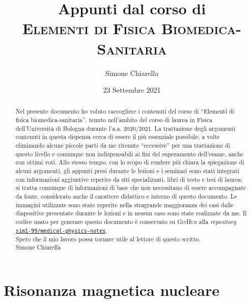 \documentclass{report}
\title{Appunti dal corso di\\\vspace{10 pt} \textsc{\huge Elementi di Fisica Biomedica-Sanitaria}}
\author{Simone Chiarella}
\date{23 Settembre 2021}
\newcommand{\virgolette}[1]{``#1''}
\numberwithin{equation}{section}
\numberwithin{figure}{section}
\begin{document}
\maketitle
\shipout\hbox{}

\begin{abstract}
\large{Nel presente documento ho voluto raccogliere i contenuti del corso di \virgolette{Elementi di fisica biomedica-sanitaria}, tenuto nell'ambito del corso di laurea in Fisica dell'Università di Bologna durante l'a.a. 2020/2021. La trattazione degli argomenti contenuti in questa dispensa cerca di essere il più essenziale possibile, a volte eliminando alcune piccole parti da me ritenute \virgolette{eccessive} per una trattazione di questo livello e comunque non indispensabili ai fini del superamento dell'esame, anche con ottimi voti. Allo stesso tempo, con lo scopo di rendere più chiara la spiegazione di alcuni argomenti, gli appunti presi durante le lezioni e i seminari sono stati integrati con informazioni aggiuntive reperite da siti specializzati, libri di testo e tesi di laurea; si tratta comunque di informazioni di base che non necessitano di essere accompagnate da fonte, considerato anche il carattere didattico e interno di questo documento. Le immagini utilizzate sono state reperite nella stragrande maggioranza dei casi dalle diapositive presentate durante le lezioni e in nessun caso sono state realizzate da me. Il codice usato per generare questo documento è conservato su \textsc{GitHub} alla \textit{repository} \href{https://github.com/sim1-99/medical-physics-notes/tree/main}{\texttt{sim1-99/medical-physics-notes}}.\\
Spero che il mio lavoro possa tornare utile al lettore di questo scritto.\\

\hspace{350 pt} Simone Chiarella}
\end{abstract}
\shipout\hbox{}

\tableofcontents

\chapter{Risonanza magnetica nucleare}
\end{document}
